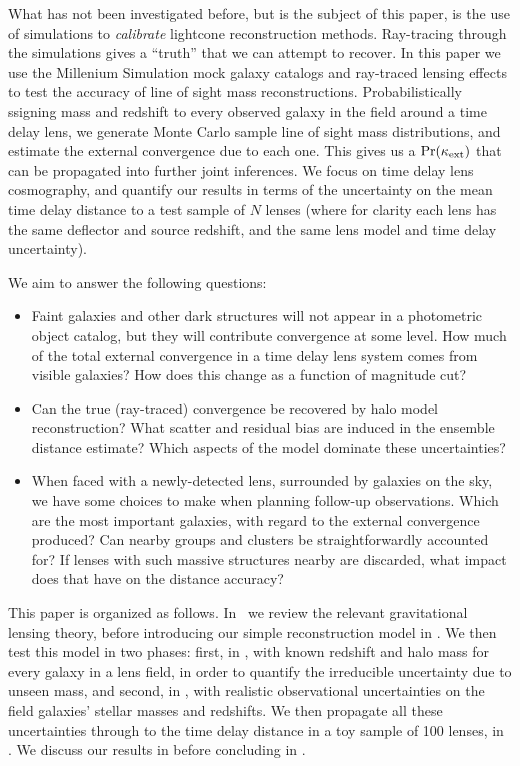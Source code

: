 \documentclass[useAMS,usenatbib]{mn2e}
\begin{document}
What has not been investigated before, but is the subject of this paper, is
the use of simulations to {\it calibrate} lightcone reconstruction methods.
Ray-tracing through the simulations gives a ``truth'' that we can attempt to
recover.  In this paper we use the Millenium Simulation mock galaxy catalogs
and ray-traced lensing effects to test the accuracy of line of sight mass
reconstructions. Probabilistically ssigning mass and redshift to every
observed galaxy in the field around a time delay lens, we generate Monte Carlo
sample line of sight mass distributions, and estimate the external convergence
due to each one. This gives us a $\Pr(\kappa_{\rm ext})$ that can be propagated into
further joint inferences. We focus on time delay lens cosmography, and
quantify our results in terms of the uncertainty on the mean time delay
distance to a test sample of $N$ lenses (where for clarity each lens has the
same deflector and source redshift, and the same lens model and time delay
uncertainty).

We aim to answer the following questions:
\begin{itemize}
\item Faint galaxies and other dark structures will not appear in a photometric
object catalog, but they will contribute convergence at some level. How much of
the total external convergence in a time delay lens system comes from visible
galaxies? How does this change as a function of magnitude cut? 
\item Can the true (ray-traced) convergence be recovered by halo model
reconstruction? What scatter and residual bias are induced in the ensemble 
distance estimate? Which aspects of the model dominate these uncertainties? 
\item When faced with a newly-detected lens, surrounded by galaxies on the sky,
we have some choices to make when planning follow-up observations.
Which are the most important galaxies, with regard to the external convergence
produced? Can nearby groups and clusters be straightforwardly accounted for? If
lenses with such massive structures nearby are discarded, what impact does that
have on the distance accuracy?
\end{itemize}

This paper is organized as follows. In~ we review the relevant
gravitational lensing theory, before introducing our simple reconstruction 
model in .  We then test this model in two phases: first, in
, with known redshift and halo mass for every galaxy in a
lens field, in order to quantify the irreducible uncertainty due to unseen mass,
and second, in , with realistic observational uncertainties
on the field galaxies' stellar masses and redshifts. We then propagate all these
uncertainties through to the time delay distance in a toy sample of 100 lenses,
in . We discuss our results in  before
concluding in .
\end{document}
